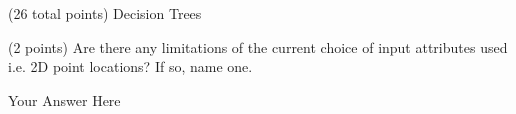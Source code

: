 \documentclass[12pt]{article}
\begin{document}
\begin{question}{(26 total points) Decision Trees}
\begin{subquestion}
\end{subquestion}



%
%
\begin{subquestion}{(2 points) 
Are there any limitations of the current choice of input attributes used i.e. 2D point locations? If so, name one. 
}


\begin{answerbox}{10em}
Your Answer Here
\end{answerbox}



\end{subquestion}


\end{question}




\clearpage
\end{document}
